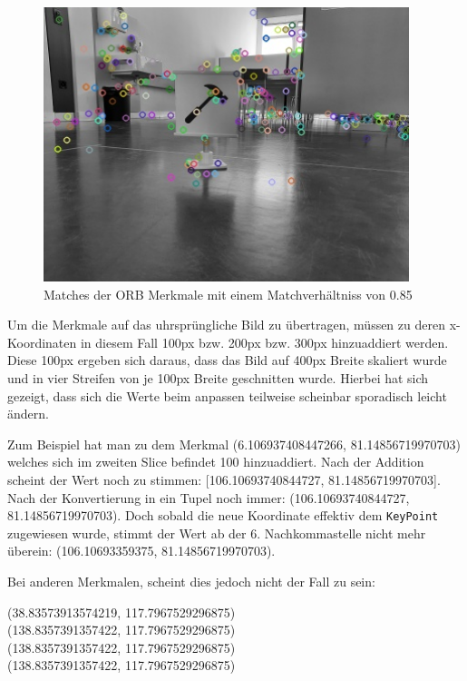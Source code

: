 \begin{figure}[H]
  \includegraphics[width=0.95\textwidth]{img/piktogrammerkennung/sift_kp2_from_slice.jpg}
  \centering
  \caption{Matches der ORB Merkmale mit einem Matchverhältniss von 0.85}
  \label{fig:sift-kp2-slice}
\end{figure}

Um die Merkmale auf das uhrsprüngliche Bild zu übertragen, müssen zu deren x-Koordinaten in diesem Fall 100px bzw. 200px bzw. 300px hinzuaddiert werden. Diese 100px ergeben sich daraus, dass das Bild auf 400px Breite skaliert wurde und in vier Streifen von je 100px Breite geschnitten wurde. Hierbei hat sich gezeigt, dass sich die Werte beim anpassen teilweise scheinbar sporadisch leicht ändern. 

Zum Beispiel hat man zu dem Merkmal (6.106937408447266, 81.14856719970703) welches sich im zweiten Slice befindet 100 hinzuaddiert. Nach der Addition scheint der Wert noch zu stimmen: [106.10693740844727, 81.14856719970703]. Nach der Konvertierung in ein Tupel noch immer: (106.10693740844727, 81.14856719970703). Doch sobald die neue Koordinate effektiv dem \texttt{KeyPoint} zugewiesen wurde, stimmt der Wert ab der 6. Nachkommastelle nicht mehr überein: (106.10693359375, 81.14856719970703).

Bei anderen Merkmalen, scheint dies jedoch nicht der Fall zu sein:

(38.83573913574219, 117.7967529296875)\\
(138.8357391357422, 117.7967529296875)\\
(138.8357391357422, 117.7967529296875)\\
(138.8357391357422, 117.7967529296875)\\

